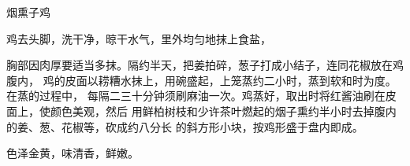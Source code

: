 \begin{recipe}{烟熏子鸡}

\ingredients


\cooking

鸡去头脚，洗干净，晾干水气，里外均匀地抹上食盐，

胸部因肉厚要适当多抹。隔约半天，把姜拍碎，葱子打成小结子，连同花椒放在鸡腹内，
鸡的皮面以耢糟水抹上，用碗盛起，上笼蒸约二小时，蒸到软和时为度。在蒸的过程中，
每隔二三十分钟须刷麻油一次。鸡蒸好，取出时将红酱油刷在皮面上，使颜色美观，然后
用鲜柏树枝和少许茶叶燃起的烟子熏约半小时去掉腹内的姜、葱、花椒等，砍成约八分长
的斜方形小块，按鸡形盛于盘内即成。

\features

色泽金黄，味清香，鲜嫩。

\end{recipe}

